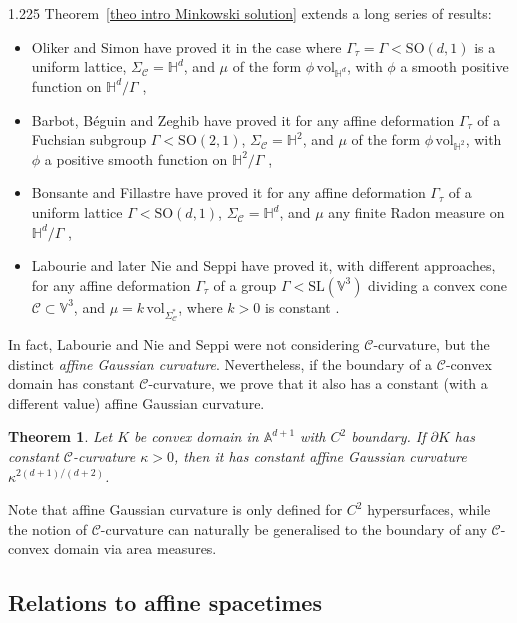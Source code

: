 \documentclass[reqno, a4paper]{amsart}
\numberwithin{equation}{section}
\numberwithin{figure}{section}
\newtheorem{maintheorem}{Theorem}
\theoremstyle{definition}
\theoremstyle{remark}
\newcommand{\V}{\mathbb{V}} %
\newcommand{\A}{\mathbb{A}} %
\renewcommand{\H}{\mathbb{H}} %
\newcommand{\SL}{\mathrm{SL}} %
\newcommand{\SO}{\mathrm{SO}} %
\newcommand{\C}{\mathcal{C}} %
\renewcommand{\S}{\Sigma_\C} %
\newcommand{\vol}{\mathrm{vol}} %
\begin{document}
\begin{spacing}{1.225}
Theorem~\ref{theo intro Minkowski solution} extends a long series of results:
\begin{itemize}
 \item Oliker and Simon have proved it in the case where $\Gamma_\tau = \Gamma < \SO(d,1)$ is a uniform lattice, $\S = \H^d$, and $\mu$ of the form $\phi \, \vol_{\H^d}$, with $\phi$ a smooth positive function on $\H^d/\Gamma$ \cite{Oliker_Simon_83},
 \item Barbot, B\'eguin and Zeghib have proved it for any affine deformation $\Gamma_\tau$ of a Fuchsian subgroup $\Gamma < \SO(2,1)$, $\S = \H^2$, and $\mu$ of the form $\phi \, \vol_{\H^2}$, with $\phi$ a positive smooth function on $\H^2/\Gamma$ \cite{BBZ_11},
 \item Bonsante and Fillastre have proved it for any affine deformation $\Gamma_\tau$ of a uniform lattice $\Gamma < \SO(d,1)$, $\S = \H^d$, and $\mu$ any finite Radon measure on $\H^d/\Gamma$ \cite{Bonsante_Fillastre_17},
 \item Labourie \cite[Theorem~8.2.1]{Labourie_07} and later Nie and Seppi \cite{Nie_Seppi_23} have proved it, with different approaches, for any affine deformation $\Gamma_\tau$ of a group $\Gamma < \SL(\V^3)$ dividing a convex cone $\C \subset \V^3$, and $\mu = k \, \vol_{\S^*}$, where $k>0$ is constant \cite{Nie_Seppi_23}. 
\end{itemize}
In fact, Labourie and Nie and Seppi were not considering $\C$-curvature, but the distinct \emph{affine Gaussian curvature}. Nevertheless, if the boundary of a $\C$-convex domain has constant $\C$-curvature, we prove that it also has a constant (with a different value) affine Gaussian curvature.

\begin{maintheorem}
\label{theo intro C-curv AGC}
Let $K$ be convex domain in $\A^{d+1}$ with $C^2$ boundary. If $\partial K$ has constant $\C$-curvature $\kappa>0$, then it has constant  affine Gaussian curvature $\kappa^{2(d+1)/(d+2)}$. 
\end{maintheorem}

Note that affine Gaussian curvature is only defined for $C^2$ hypersurfaces, while the notion of $\C$-curvature can naturally be generalised to the boundary of any $\C$-convex domain via area measures. 



\subsection*{Relations to affine spacetimes}


\end{spacing}
\end{document}
